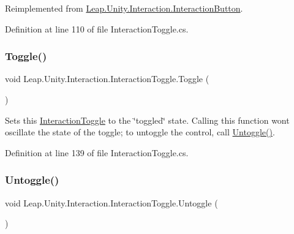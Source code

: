 Reimplemented from \mbox{\hyperlink{class_leap_1_1_unity_1_1_interaction_1_1_interaction_button_a24a0efb036a0b9ac108e9bf1d5b9fb62}{Leap.\+Unity.\+Interaction.\+Interaction\+Button}}.



Definition at line 110 of file Interaction\+Toggle.\+cs.

\mbox{\label{class_leap_1_1_unity_1_1_interaction_1_1_interaction_toggle_a8f7718af1921acdf098f92cea3ec496f}} 
\subsubsection{\texorpdfstring{Toggle()}{Toggle()}}
{\footnotesize\ttfamily void Leap.\+Unity.\+Interaction.\+Interaction\+Toggle.\+Toggle (\begin{DoxyParamCaption}{ }\end{DoxyParamCaption})}



Sets this \mbox{\hyperlink{class_leap_1_1_unity_1_1_interaction_1_1_interaction_toggle}{Interaction\+Toggle}} to the \char`\"{}toggled\char`\"{} state. Calling this function won\textquotesingle{}t oscillate the state of the toggle; to \textquotesingle{}untoggle\textquotesingle{} the control, call \mbox{\hyperlink{class_leap_1_1_unity_1_1_interaction_1_1_interaction_toggle_a86710d731160a015986142cfe47e01e0}{Untoggle()}}. 



Definition at line 139 of file Interaction\+Toggle.\+cs.

\mbox{\label{class_leap_1_1_unity_1_1_interaction_1_1_interaction_toggle_a86710d731160a015986142cfe47e01e0}} 
\subsubsection{\texorpdfstring{Untoggle()}{Untoggle()}}
{\footnotesize\ttfamily void Leap.\+Unity.\+Interaction.\+Interaction\+Toggle.\+Untoggle (\begin{DoxyParamCaption}{ }\end{DoxyParamCaption})}



